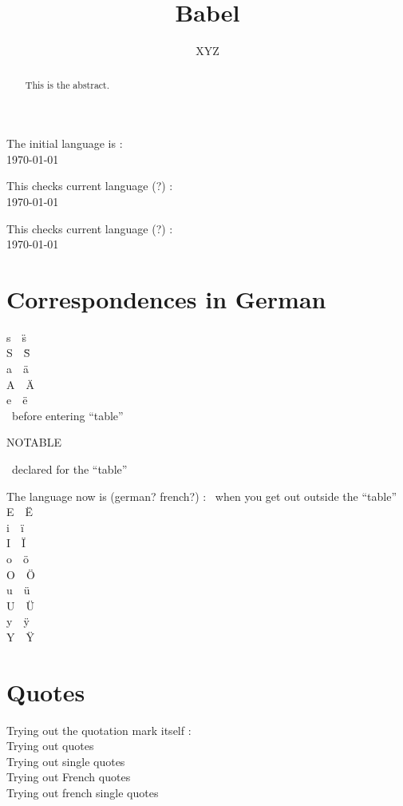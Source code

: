 \documentclass{article}
\title{Babel}
\author{XYZ}
\begin{document}
The initial language is : 
\\
\today\\
\newcommand{\DQ}[1]{\dq#1~~\"#1}

\maketitle

This checks current language (?) : %
{}\\
\today\\
\tableofcontents

This checks current language (?) : %
{}\\
\today\\
\begin{abstract}
This is the abstract.
\end{abstract}

\section{Correspondences in German}
\DQ{s}\\
\DQ{S}\\
\DQ{a}\\
\DQ{A}\\
\DQ{e}\\
~before entering ``table''
\begin{table}
\caption{NOTABLE}
~declared for the ``table''
\end{table}
The language now is (german? french?) : 
~when you get out outside the ``table''\\
\DQ{E}\\
\DQ{i}\\
\DQ{I}\\
\DQ{o}\\
\DQ{O}\\
\DQ{u}\\
\DQ{U}\\
\DQ{y}\\
\DQ{Y}

\section{Quotes}
\noindent
Trying out the quotation mark itself : \dq\\
\glqq Trying out quotes \grqq\\
\glq Trying out single quotes \grq\\
\flqq Trying out French quotes \frqq\\
\flq Trying out french single quotes \frq
\end{document}
